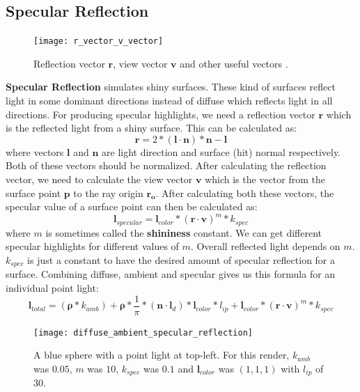 \documentclass[11pt,a4paper]{article}
\begin{document}
	\subsection{Specular Reflection}
	\begin{figure}
		\centering
		\texttt{[image: r\_vector\_v\_vector]} 
		\caption{Reflection vector $\boldsymbol{r}$, view vector $\boldsymbol{v}$ and other useful vectors \protect\cite{shadinglecture}.}
		\label{fig:wrapfig}
	\end{figure}
	\textbf{Specular Reflection} simulates shiny surfaces. These kind of surfaces reflect light in some dominant directions instead of diffuse which reflects light in all directions. For producing specular highlights, we need a reflection vector $\boldsymbol{r}$ which is the reflected light from a shiny surface. This can be calculated as:
	\begin{equation}
		\boldsymbol{r} = 2 * (\boldsymbol{l} \cdot \boldsymbol{n}) * \boldsymbol{n} - \boldsymbol{l}
	\end{equation}
	where vectors $\boldsymbol{l}$ and $\boldsymbol{n}$ are light direction and surface (hit) normal respectively. Both of these vectors should be normalized. After calculating the reflection vector, we need to calculate the view vector $\boldsymbol{v}$ which is the vector from the surface point $\boldsymbol{p}$ to the ray origin $\boldsymbol{r_{o}}$. After calculating both these vectors, the specular value of a surface point can then be calculated as:
	\begin{equation}
		\boldsymbol{l}_{specular} = \boldsymbol{l}_{color} * (\boldsymbol{r} \cdot \boldsymbol{v})^m * k_{spec}
	\end{equation}
	where $m$ is sometimes called the \textbf{shininess} constant. We can get different specular highlights for different values of $m$. Overall reflected light depends on $m$. $k_{spec}$ is just a constant to have the desired amount of specular reflection for a surface. Combining diffuse, ambient and specular gives us this formula for an individual point light:
	\begin{equation}
		\boldsymbol{l}_{total} = (\boldsymbol{\rho} * k_{amb}) + \boldsymbol{\rho} * \frac{1}{\pi} * (\boldsymbol{n} \cdot \boldsymbol{l}_{d}) * \boldsymbol{l}_{color} * l_{ip} + \boldsymbol{l}_{color} * (\boldsymbol{r} \cdot \boldsymbol{v})^m * k_{spec}
	\end{equation}
	\begin{figure}[H]
		\centering
		\captionsetup{justification=centering}
		\texttt{[image: diffuse\_ambient\_specular\_reflection]}\quad
		\caption{A blue sphere with a point light at top-left. For this render, $k_{amb}$ was $0.05$, $m$ was $10$, $k_{spec}$ was $0.1$ and $\boldsymbol{l}_{color}$ was $(1, 1, 1)$ with $l_{ip}$ of 30.}
	\end{figure}
	
\end{document}
